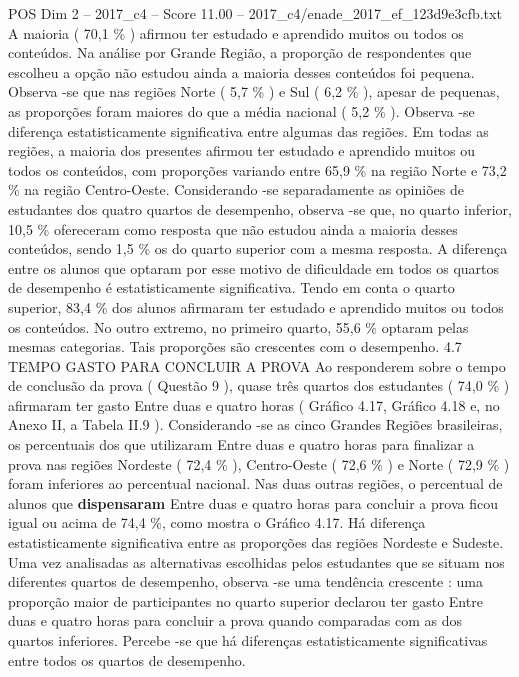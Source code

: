 \begin{textsample}{POS Dim 2 – 2017\_c4 – Score 11.00 – 2017\_c4/enade\_2017\_ef\_123d9e3cfb.txt}
A maioria ( 70,1 \% ) afirmou ter estudado e aprendido muitos ou todos os conteúdos.
Na análise por Grande Região, a proporção de respondentes que escolheu a opção não estudou ainda a maioria desses conteúdos foi pequena.
Observa -se que nas regiões Norte ( 5,7 \% ) e Sul ( 6,2 \% ), apesar de pequenas, as proporções foram maiores do que a média nacional ( 5,2 \% ).
Observa -se diferença estatisticamente significativa entre algumas das regiões.
Em todas as regiões, a maioria dos presentes afirmou ter estudado e aprendido muitos ou todos os conteúdos, com proporções variando entre 65,9 \% na região Norte e 73,2 \% na região Centro-Oeste.
Considerando -se separadamente as opiniões de estudantes dos quatro quartos de desempenho, observa -se que, no quarto inferior, 10,5 \% ofereceram como resposta que não estudou ainda a maioria desses conteúdos, sendo 1,5 \% os do quarto superior com a mesma resposta.
A diferença entre os alunos que optaram por esse motivo de dificuldade em todos os quartos de desempenho é estatisticamente significativa.
Tendo em conta o quarto superior, 83,4 \% dos alunos afirmaram ter estudado e aprendido muitos ou todos os conteúdos.
No outro extremo, no primeiro quarto, 55,6 \% optaram pelas mesmas categorias.
Tais proporções são crescentes com o desempenho. 4.7 TEMPO GASTO PARA CONCLUIR A PROVA Ao responderem sobre o tempo de conclusão da prova ( Questão 9 ), quase três quartos dos estudantes ( 74,0 \% ) afirmaram ter gasto Entre duas e quatro horas ( Gráfico 4.17, Gráfico 4.18 e, no Anexo II, a Tabela II.9 ).
Considerando -se as cinco Grandes Regiões brasileiras, os percentuais dos que utilizaram Entre duas e quatro horas para finalizar a prova nas regiões Nordeste ( 72,4 \% ), Centro-Oeste ( 72,6 \% ) e Norte ( 72,9 \% ) foram inferiores ao percentual nacional.
Nas duas outras regiões, o percentual de alunos que \textbf{dispensaram} Entre duas e quatro horas para concluir a prova ficou igual ou acima de 74,4 \%, como mostra o Gráfico 4.17.
Há diferença estatisticamente significativa entre as proporções das regiões Nordeste e Sudeste.
Uma vez analisadas as alternativas escolhidas pelos estudantes que se situam nos diferentes quartos de desempenho, observa -se uma tendência crescente : uma proporção maior de participantes no quarto superior declarou ter gasto Entre duas e quatro horas para concluir a prova quando comparadas com as dos quartos inferiores.
Percebe -se que há diferenças estatisticamente significativas entre todos os quartos de desempenho.

\end{textsample}
